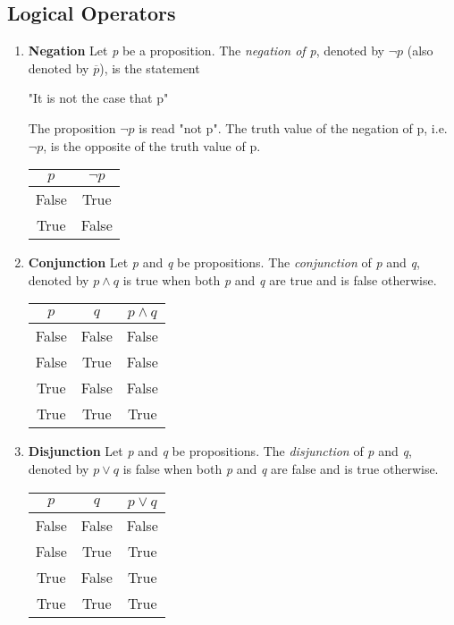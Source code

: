 \documentclass{book}
\begin{document}
\subsection {Logical Operators}
\begin{enumerate}
\item \textbf{Negation}
Let \emph{p} be a proposition. The \emph{negation of p}, denoted by $\lnot p$
(also denoted by $\overline p$), is the statement
\begin{center}
"It is not the case that p"
\end{center}
The proposition $\lnot p$ is read "not p". The truth value of the negation of p, i.e. $\lnot p$, is the opposite of the truth value of p.

\begin{center}
\begin{tabular}{ |c|c|}
\hline
$p$ & $\neg p$  \\ \hline
False & True \\ 
True & False \\ \hline
\end{tabular}
\end{center}

\item \textbf{Conjunction}
Let \emph{p} and \emph{q} be propositions. The \emph{conjunction} of \emph{p} and \emph{q}, denoted by $p \land q$ is true when both \emph{p} and \emph{q} are true and is false otherwise.

\begin{center}
\begin{tabular}{ |c|c|c|}
\hline
$p$ & $q$ & $p \land q$  \\ \hline
False & False & False \\
False & True & False \\
True & False & False \\
True & True & True \\ \hline
\end{tabular}
\end{center}

\item \textbf{Disjunction}
Let \emph{p} and \emph{q} be propositions. The \emph{disjunction} of \emph{p} and \emph{q}, denoted by $p \lor q$ is false when both \emph{p} and \emph{q} are false and is true otherwise.

\begin{center}
\begin{tabular}{ |c|c|c|}
\hline
$p$ & $q$ & $p \lor q$  \\ \hline
False & False & False \\
False & True & True \\
True & False & True \\
True & True & True \\ \hline
\end{tabular}
\end{center}


\end{enumerate}
\end{document}
